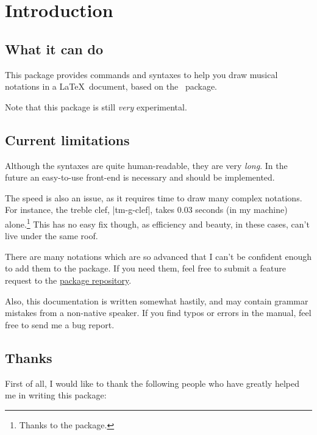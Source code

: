 \section{Introduction}\label{sec:intro}
\subsection{What it can do}\label{sec:intro:intro}
This package provides commands and syntaxes to help you draw musical notations in 
a \LaTeX\ document, based on the \tikzname\ package.

Note that this package is still \emph{very} experimental.
\subsection{Current limitations}\label{sec:intro:limitations}
Although the syntaxes are quite human-readable, they are very \emph{long}. In 
the future an easy-to-use front-end is necessary and should be implemented.

The speed is also an issue, as it requires time to draw many complex notations. 
For instance, the treble clef, |tm-g-clef|, takes $0.03$ seconds (in my machine) 
alone.\footnote{Thanks to the  package.} This has no easy fix 
though, as efficiency and beauty, in these cases, can't live under the same roof.

There are many notations which are so advanced that I can't be confident enough 
to add them to the package. If you need them, feel free to submit a feature 
request to the \href{https://github.com/joulev/tikzmusic}{package repository}. 

Also, this documentation is written somewhat hastily, and may contain grammar 
mistakes from a non-native speaker. If you find typos or errors in the manual, 
feel free to send me a bug report.
\subsection{Thanks}\label{sec:intro:thanks}
First of all, I would like to thank the following people who have greatly 
helped me in writing this package:

